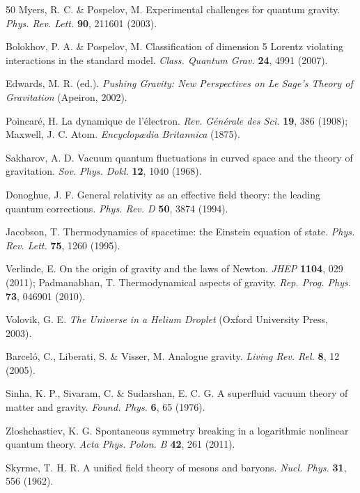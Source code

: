 \documentclass[UTF8,fontset=none,11pt,a4paper]{ctexart}
\begin{document}
\begin{thebibliography}{50}
 Myers, R. C. \& Pospelov, M. Experimental challenges for quantum gravity.
\emph{Phys. Rev. Lett.} \textbf{90}, 211601 (2003).

 Bolokhov, P. A. \& Pospelov, M. Classification of dimension 5 Lorentz
violating interactions in the standard model. \emph{Class. Quantum Grav.} \textbf{24}, 4991
(2007).

 Edwards, M. R. (ed.). \emph{Pushing Gravity: New Perspectives on Le Sage's
Theory of Gravitation} (Apeiron, 2002).

 Poincar\'e, H. La dynamique de l'\'electron. \emph{Rev. G\'en\'erale des
Sci.} \textbf{19}, 386 (1908); Maxwell, J. C. Atom. \emph{Encyclop\ae dia Britannica} (1875).

 Sakharov, A. D. Vacuum quantum fluctuations in curved space and the
theory of gravitation. \emph{Sov. Phys. Dokl.} \textbf{12}, 1040 (1968).

 Donoghue, J. F. General relativity as an effective field theory: the
leading quantum corrections. \emph{Phys. Rev. D} \textbf{50}, 3874 (1994).

 Jacobson, T. Thermodynamics of spacetime: the Einstein equation of state.
\emph{Phys. Rev. Lett.} \textbf{75}, 1260 (1995).

 Verlinde, E. On the origin of gravity and the laws of Newton.
\emph{JHEP} \textbf{1104}, 029 (2011); Padmanabhan, T. Thermodynamical aspects of gravity.
\emph{Rep. Prog. Phys.} \textbf{73}, 046901 (2010).

 Volovik, G. E. \emph{The Universe in a Helium Droplet} (Oxford University
Press, 2003).

 Barcel\'o, C., Liberati, S. \& Visser, M. Analogue gravity.
\emph{Living Rev. Rel.} \textbf{8}, 12 (2005).

 Sinha, K. P., Sivaram, C. \& Sudarshan, E. C. G. A superfluid vacuum theory of
matter and gravity. \emph{Found. Phys.} \textbf{6}, 65 (1976).

 Zloshchastiev, K. G. Spontaneous symmetry breaking in a logarithmic
nonlinear quantum theory. \emph{Acta Phys. Polon. B} \textbf{42}, 261 (2011).

 Skyrme, T. H. R. A unified field theory of mesons and baryons.
\emph{Nucl. Phys.} \textbf{31}, 556 (1962).


\end{thebibliography}
\end{document}
